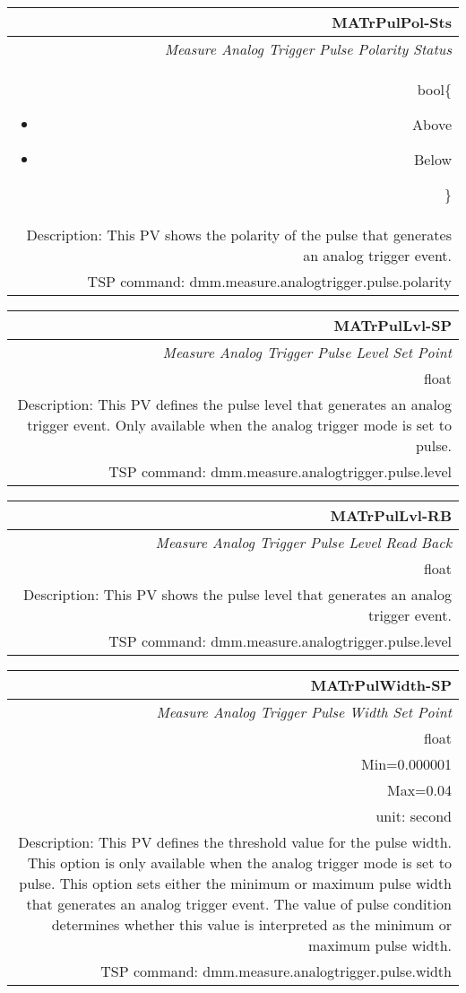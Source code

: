 \documentclass[openany]{article}
\begin{document}
		\begin{tabular}{N}
			\hline
			\bfseries MATrPulPol-Sts\label{pv:matrpulpol-sts} \\ \hline
			\emph{Measure Analog Trigger Pulse Polarity Status} \\
			bool\{\begin{itemize}[noitemsep]
				\small
				\item[] Above
				\item[] Below
			\end{itemize}\} \\
			Description: This PV shows the polarity of the pulse that generates an analog trigger event. \\
			TSP command: dmm.measure.analogtrigger.pulse.polarity
		\end{tabular}

		\begin{tabular}{N}
			\hline
			\bfseries MATrPulLvl-SP\label{pv:matrpullvl-sp} \\ \hline
			\emph{Measure Analog Trigger Pulse Level Set Point} \\
			float \\
			Description: This PV defines the pulse level that generates an analog trigger event. Only available when the analog trigger mode is set to pulse. \\
			TSP command: dmm.measure.analogtrigger.pulse.level
		\end{tabular}

		\begin{tabular}{N}
			\hline
			\bfseries MATrPulLvl-RB\label{pv:matrpullvl-rb} \\ \hline
			\emph{Measure Analog Trigger Pulse Level Read Back} \\
			float \\
			Description: This PV shows the pulse level that generates an analog trigger event. \\
			TSP command: dmm.measure.analogtrigger.pulse.level
		\end{tabular}

		\begin{tabular}{N}
			\hline
			\bfseries MATrPulWidth-SP\label{pv:matrpulwidth-sp} \\ \hline
			\emph{Measure Analog Trigger Pulse Width Set Point} \\
			float \\
			Min=0.000001 \\
			Max=0.04 \\
			unit: second \\
			Description: This PV defines the threshold value for the pulse width. This option is only available when the analog trigger mode is set to pulse. This option sets either the minimum or maximum pulse width that generates an analog trigger event. The value of pulse condition determines whether this value is interpreted as the minimum or maximum pulse width. \\
			TSP command: dmm.measure.analogtrigger.pulse.width
		\end{tabular}
\end{document}
